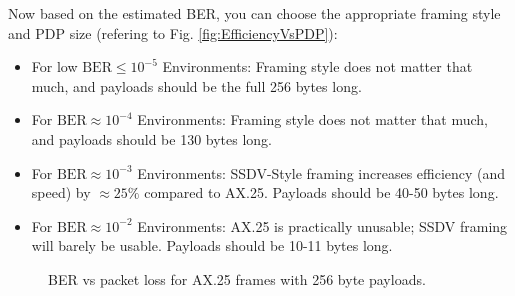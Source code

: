 \documentclass[letterpaper]{article}
\begin{document}
Now based on the estimated BER, you can choose the appropriate framing style and PDP size (refering to Fig. \ref{fig:EfficiencyVsPDP}):
\begin{itemize}
    \item For low $\text{BER}\leq10^{-5}$ Environments: Framing style does not matter that much, and payloads should be the full 256 bytes long.
    \item For $\text{BER}\approx 10^{-4}$ Environments: Framing style does not matter that much, and payloads should be 130 bytes long.
    \item For $\text{BER}\approx 10^{-3}$ Environments: SSDV-Style framing increases efficiency (and speed) by $\approx 25\%$ compared to AX.25. Payloads should be 40-50 bytes long.
    \item For $\text{BER}\approx 10^{-2}$ Environments: AX.25 is practically unusable; SSDV framing will barely be usable. Payloads should be 10-11 bytes long.
\end{itemize}

\begin{figure}[tbp]
\centering
{}
\caption{BER vs packet loss for AX.25 frames with 256 byte payloads.}\label{fig:BERvsLoss}
\end{figure}
\end{document}
